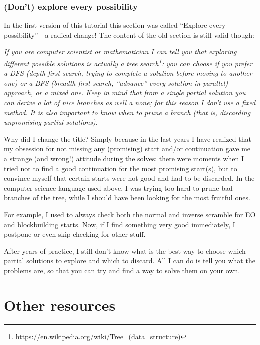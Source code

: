 \documentclass[11pt,a4paper]{book}
\begin{document}
\subsection{(Don't) explore every possibility}

In the first version of this tutorial this section was called ``Explore every possibility'' - a radical change! The content of the old section is still valid though:

\bigskip
\emph{If you are computer scientist or mathematician I can tell you that exploring different possible solutions is actually a tree search\footnote{\url{https://en.wikipedia.org/wiki/Tree_(data_structure)}}: you can choose if you prefer a DFS (depth-first search, trying to complete a solution before moving to another one) or a BFS (breadth-first search, “advance” every solution in parallel) approach, or a mixed one. Keep in mind that from a single partial solution you can derive a lot of nice branches as well a none; for this reason I don't use a fixed method. It is also important to know when to prune a branch (that is, discarding unpromising partial solutions).}

\bigskip
Why did I change the title? Simply because in the last years I have realized that my obsession for not missing any (promising) start and/or continuation gave me a strange (and wrong!) attitude during the solves: there were moments when I tried not to find a good continuation for the most promising start(s), but to convince myself that certain starts were not good and had to be discarded. In the computer science language used above, I was trying too hard to prune bad branches of the tree, while I should have been looking for the most fruitful ones.

For example, I used to always check both the normal and inverse scramble for EO and blockbuilding starts. Now, if I find something very good immediately, I postpone or even skip checking for other stuff.

After years of practice, I still don't know what is the best way to choose which partial solutions to explore and which to discard. All I can do is tell you what the problems are, so that you can try and find a way to solve them on your own.

\appendix

\chapter{Other resources}
\label{other_sources}
\end{document}
